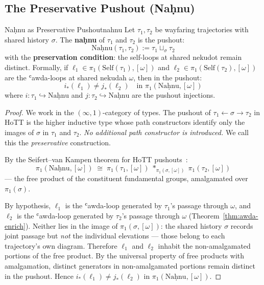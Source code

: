 \documentclass[11pt,a4paper]{article}
\begin{document}
\subsection{The Preservative Pushout (Naḥnu)}

\begin{thmbox}{Naḥnu as Preservative Pushout}{nahnu}
Let $\tau_1, \tau_2$ be wayfaring trajectories with shared history $\sigma$. The \textbf{naḥnu} of $\tau_1$ and $\tau_2$ is the pushout:
\[
\mathrm{Naḥnu}(\tau_1, \tau_2) := \tau_1 \sqcup_\sigma \tau_2
\]
with the \textbf{preservation condition}: the self-loops at shared nekudot remain distinct. Formally, if $\ell_1 \in \pi_1(\mathrm{Self}(\tau_1), [\omega])$ and $\ell_2 \in \pi_1(\mathrm{Self}(\tau_2), [\omega])$ are the ʿawda-loops at shared nekudah $\omega$, then in the pushout:
\[
i_*(\ell_1) \neq j_*(\ell_2) \quad \text{in } \pi_1(\mathrm{Naḥnu}, [\omega])
\]
where $i : \tau_1 \hookrightarrow \mathrm{Naḥnu}$ and $j : \tau_2 \hookrightarrow \mathrm{Naḥnu}$ are the pushout injections.
\end{thmbox}
\begin{proof}
We work in the $(\infty,1)$-category of types. The pushout of $\tau_1 \xleftarrow{} \sigma \xrightarrow{} \tau_2$ in HoTT is the higher inductive type whose path constructors identify only the images of $\sigma$ in $\tau_1$ and $\tau_2$. \emph{No additional path constructor is introduced.} We call this the \emph{preservative} construction.

By the Seifert--van Kampen theorem for HoTT pushouts~\cite{ufp2013}:
\[
\pi_1(\mathrm{Naḥnu}, [\omega]) \;\cong\; \pi_1(\tau_1, [\omega]) \;*_{\pi_1(\sigma, [\omega])}\; \pi_1(\tau_2, [\omega])
\]
— the free product of the constituent fundamental groups, amalgamated over $\pi_1(\sigma)$.

By hypothesis, $\ell_1$ is the ʿawda-loop generated by $\tau_1$'s passage through $\omega$, and $\ell_2$ is the ʿawda-loop generated by $\tau_2$'s passage through $\omega$ (Theorem~\ref{thm:awda-enrich}). Neither lies in the image of $\pi_1(\sigma, [\omega])$: the shared history $\sigma$ records joint passage but \emph{not} the individual elevations — those belong to each trajectory's own diagram. Therefore $\ell_1$ and $\ell_2$ inhabit the non-amalgamated portions of the free product. By the universal property of free products with amalgamation, distinct generators in non-amalgamated portions remain distinct in the pushout. Hence $i_*(\ell_1) \neq j_*(\ell_2)$ in $\pi_1(\mathrm{Naḥnu}, [\omega])$.
\end{proof}
\end{document}
